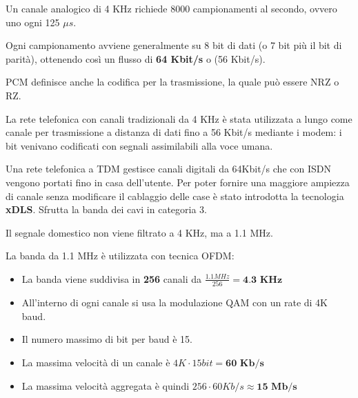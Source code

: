             Un canale analogico di 4 KHz richiede 8000 campionamenti al secondo, ovvero uno ogni 125 $\mu s$.

            Ogni campionamento avviene generalmente su 8 bit di dati (o 7 bit più il bit di parità), ottenendo così un flusso di \textbf{64 Kbit/s} o (56 Kbit/s).

            PCM definisce anche la codifica per la trasmissione, la quale può essere NRZ o RZ.

            La rete telefonica con canali tradizionali da 4 KHz è stata utilizzata a lungo come canale per trasmissione a distanza di dati fino a 56 Kbit/s mediante i modem: i bit venivano codificati con segnali assimilabili alla voce umana.

            Una rete telefonica a TDM gestisce canali digitali da 64Kbit/s che con ISDN vengono portati fino in casa dell'utente. Per poter fornire una maggiore ampiezza di canale senza modificare il cablaggio delle case è stato introdotta la tecnologia \textbf{xDLS}. Sfrutta la banda dei cavi in categoria 3.

            Il segnale domestico non viene filtrato a 4 KHz, ma a 1.1 MHz.

            La banda da 1.1 MHz è utilizzata con tecnica OFDM:
            \begin{itemize}
                \item La banda viene suddivisa in \textbf{256} canali da $\frac{1.1 MHz}{256} = \textbf{4.3 KHz}$
                \item All'interno di ogni canale si usa la modulazione QAM con un rate di 4K baud.
                \item Il numero massimo di bit per baud è 15.
                \item La massima velocità di un canale è $4K \cdot 15 bit = \textbf{60 Kb/s}$
                \item La massima velocità aggregata è quindi $256 \cdot 60Kb/s \approx \textbf{15 Mb/s}$
            \end{itemize}

